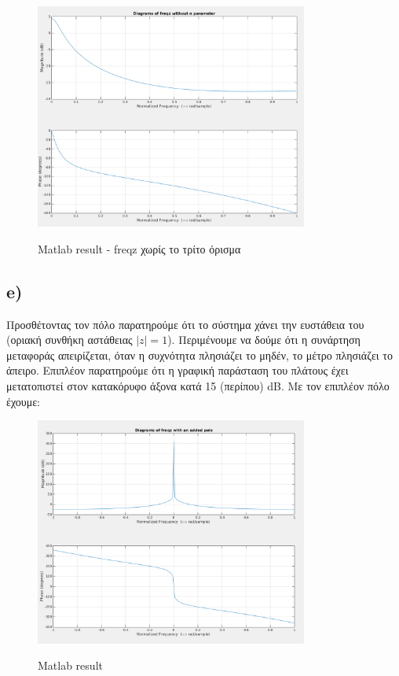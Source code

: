 \documentclass[11pt]{article}
\begin{document}
\begin{figure}[H]
    \centering
   \includegraphics[scale=0.5, width=0.8\textwidth]{photos/1d-freqz-without_n.png} \\
    \caption{Matlab result - freqz χωρίς το τρίτο όρισμα}
\end{figure}

\subsection*{e)}
Προσθέτοντας τον πόλο παρατηρούμε ότι το σύστημα χάνει την ευστάθεια του (οριακή συνθήκη αστάθειας $|z|=1$). Περιμένουμε να δούμε ότι η συνάρτηση μεταφοράς απειρίζεται, όταν η συχνότητα πλησιάζει το μηδέν, το μέτρο πλησιάζει το άπειρο. Επιπλέον παρατηρούμε ότι η γραφική παράσταση του πλάτους έχει μετατοπιστεί στον κατακόρυφο άξονα κατά 15 (περίπου) dB.
Με τον επιπλέον πόλο έχουμε:
\[
\]

\begin{figure}[H]
    \centering
   \includegraphics[scale=0.5, width=0.8\textwidth]{photos/1e-freqz-with-pole-1.png} \\
    \caption{Matlab result}
\end{figure}
\end{document}
